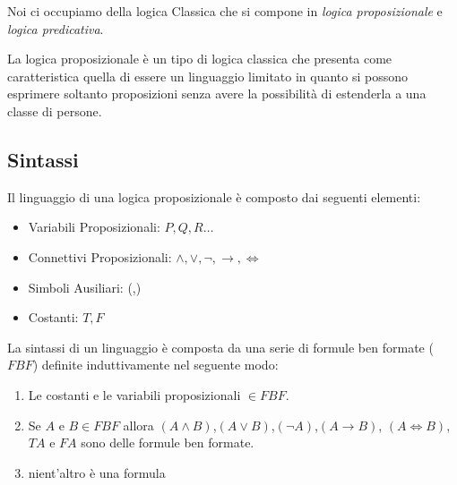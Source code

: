 \documentclass[a4paper,12pt, oneside]{book}
\begin{document}
Noi ci occupiamo della logica Classica che si compone in \textit{logica
  proposizionale} e \textit{logica predicativa}.

La logica proposizionale è un tipo di logica classica che presenta come
caratteristica quella di essere un linguaggio limitato in quanto si possono
esprimere soltanto proposizioni senza avere la possibilità di estenderla a una
classe di persone.
\newpage
\subsection{Sintassi}
Il linguaggio di una logica proposizionale è composto dai seguenti elementi:

\begin{itemize}
  \item Variabili Proposizionali: $P,Q,R \dots$
  \item Connettivi Proposizionali: $\land, \lor, \neg, \rightarrow, \iff$
  \item Simboli Ausiliari: (,)
  \item Costanti: $T,F$
\end{itemize}

La sintassi di un linguaggio è composta da una serie di formule ben
formate ($FBF$) definite induttivamente nel seguente modo:
\begin{enumerate}
  \item Le costanti e le variabili proposizionali $\in FBF$.

  \item Se $A$ e $B \in FBF$ allora $(A \land B)$,$(A \lor B)$,$(\neg A)$,$(A
  \rightarrow B)$, $(A \iff B)$, $TA$ e $FA$ sono delle formule ben formate.
  \item nient'altro è una formula
\end{enumerate}
\end{document}
